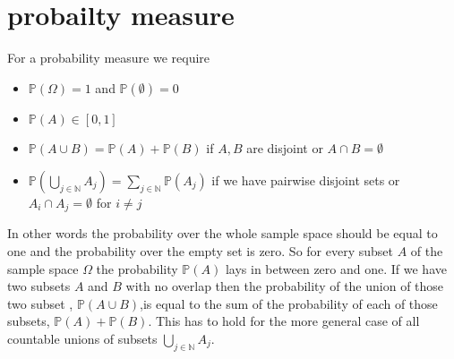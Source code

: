 \section{probailty measure}
For a probability measure we require
\begin{itemize}
	\item $\mathbb{P}(\Omega) = 1$ and $\mathbb{P}(\emptyset) = 0$
	\item $\mathbb{P}(A) \in [0,1]$
	\item $\mathbb{P}(A \cup B) =\mathbb{P}(A) + \mathbb{P}(B) $ if $A, B$ are disjoint or $A\cap B = \emptyset$
	\item $\mathbb{P}(\bigcup_{j \in \mathbb{N}} A_j )= \sum_{j \in \mathbb{N}}  \mathbb{P}(A_j)$ if we have pairwise disjoint sets or $A_i \cap A_j = \emptyset$ for $i \neq j $
\end{itemize}

In other words the probability over the whole sample space should be equal to one and the probability over the empty set is zero.
So for every subset $A$ of the sample space $\Omega$ the probability $\mathbb{P}(A)$ lays in between zero and one.
If we have two subsets $A$ and $B$ with no overlap then the probability of the union of those two subset , $\mathbb{P}(A \cup B)$,is equal to the sum of the probability of each of those subsets, $\mathbb{P}(A) + \mathbb{P}(B)$.
This has to hold for the more general case of all countable unions of subsets $\bigcup_{j \in \mathbb{N}} A_j$.